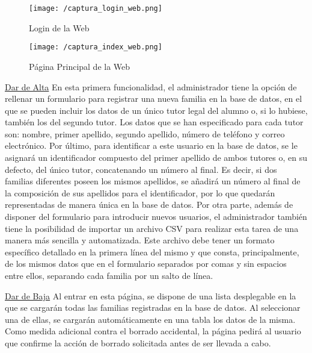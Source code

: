 \begin{figure}[!h]
	\begin{center}
		\texttt{[image: /captura\_login\_web.png]}
		\caption{Login de la Web}
		\label{fig:login_web}
	\end{center}
\end{figure}

\begin{figure}[!h]
	\begin{center}
		\texttt{[image: /captura\_index\_web.png]}
		\caption{Página Principal de la Web}
		\label{fig:index_web}
	\end{center}
\end{figure}

\newpage

\noindent \underline{Dar de Alta} \newline
En esta primera funcionalidad, el administrador tiene la opción de rellenar un formulario para registrar una nueva familia en la base de datos, en el que se pueden incluir los datos de un único tutor legal del alumno o, si lo hubiese, también los del segundo tutor. Los datos que se han especificado para cada tutor son: nombre, primer apellido, segundo apellido, número de teléfono y correo electrónico. Por último, para identificar a este usuario en la base de datos, se le asignará un identificador compuesto del primer apellido de ambos tutores o, en su defecto, del único tutor, concatenando un número al final. Es decir, si dos familias diferentes poseen los mismos apellidos, se añadirá un número al final de la composición de sus apellidos para el identificador, por lo que quedarán representadas de manera única en la base de datos. Por otra parte, además de disponer del formulario para introducir nuevos usuarios, el administrador también tiene la posibilidad de importar un archivo \acs{CSV} para realizar esta tarea de una manera más sencilla y automatizada. Este archivo debe tener un formato específico detallado en la primera línea del mismo y que consta, principalmente, de los mismos datos que en el formulario separados por comas y sin espacios entre ellos, separando cada familia por un salto de línea.

\noindent \underline{Dar de Baja} \newline
Al entrar en esta página, se dispone de una lista desplegable en la que se cargarán todas las familias registradas en la base de datos. Al seleccionar una de ellas, se cargarán automáticamente en una tabla los datos de la misma. Como medida adicional contra el borrado accidental, la página pedirá al usuario que confirme la acción de borrado solicitada antes de ser llevada a cabo.

